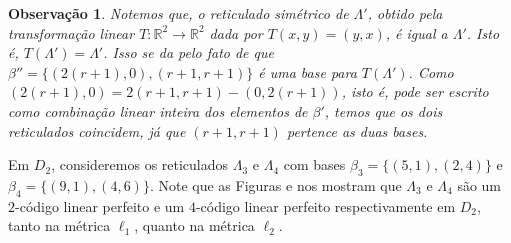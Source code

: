 \documentclass{article}
\theoremstyle{plain}
\newtheorem{observation}{Observa\c{c}\~ao}
\theoremstyle{definition}
\theoremstyle{remark}
\begin{document}
  \begin{observation}
    Notemos que, o reticulado simétrico de $\Lambda'$, obtido pela transformação linear $T: \mathbb{R}^2 \to \mathbb{R}^2$ dada por $T(x,y) = (y,x)$, é igual a $\Lambda'$. Isto é, $T(\Lambda') = \Lambda'$. Isso se da pelo fato de que $\beta''=\{(2(r+1),0),(r+1,r+1)\}$ é uma base para $T(\Lambda')$. Como $(2(r+1),0) = 2(r+1,r+1)-(0,2(r+1))$, isto é, pode ser escrito como combinação linear inteira dos elementos de $\beta'$, temos que os dois reticulados coincidem, já que $(r+1,r+1)$ pertence as duas bases. 
  \end{observation}

  Em $D_2$, consideremos os reticulados $\Lambda_3$ e $\Lambda_4$ com bases $\beta_3 = \{(5,1),(2,4)\}$ e $\beta_4 = \{(9,1),(4,6)\}$. Note que as Figuras e nos mostram que $\Lambda_3$ e $\Lambda_4$ são um $2$-código linear perfeito e um $4$-código linear perfeito respectivamente em $D_2$, tanto na métrica $\ell_1$, quanto na métrica $\ell_2$.
  
\end{document}
